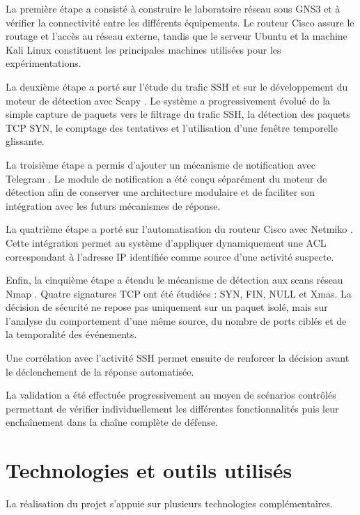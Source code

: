 La première étape a consisté à construire le laboratoire réseau sous GNS3 \cite{gns3_docs} et
à vérifier la connectivité entre les différents équipements. Le routeur Cisco
assure le routage et l’accès au réseau externe, tandis que le serveur Ubuntu
et la machine Kali Linux constituent les principales machines utilisées pour
les expérimentations.

La deuxième étape a porté sur l’étude du trafic SSH et sur le développement
du moteur de détection avec Scapy \cite{scapy_docs}. Le système a progressivement évolué de la
simple capture de paquets vers le filtrage du trafic SSH, la détection des
paquets TCP SYN, le comptage des tentatives et l’utilisation d’une fenêtre
temporelle glissante.

La troisième étape a permis d’ajouter un mécanisme de notification avec
Telegram \cite{telegram_bot_api}. Le module de notification a été conçu séparément du moteur de
détection afin de conserver une architecture modulaire et de faciliter son
intégration avec les futurs mécanismes de réponse.

La quatrième étape a porté sur l’automatisation du routeur Cisco avec
Netmiko \cite{netmiko_docs}. Cette intégration permet au système d’appliquer dynamiquement une
ACL correspondant à l’adresse IP identifiée comme source d’une activité
suspecte.

Enfin, la cinquième étape a étendu le mécanisme de détection aux scans réseau
Nmap \cite{nmap_reference}. Quatre signatures TCP ont été étudiées : SYN, FIN, NULL et Xmas. La
décision de sécurité ne repose pas uniquement sur un paquet isolé, mais sur
l’analyse du comportement d’une même source, du nombre de ports ciblés et de
la temporalité des événements.

Une corrélation avec l’activité SSH permet ensuite de renforcer la décision
avant le déclenchement de la réponse automatisée.

La validation a été effectuée progressivement au moyen de scénarios contrôlés
permettant de vérifier individuellement les différentes fonctionnalités puis
leur enchaînement dans la chaîne complète de défense.

\section{Technologies et outils utilisés}

La réalisation du projet s’appuie sur plusieurs technologies complémentaires.


